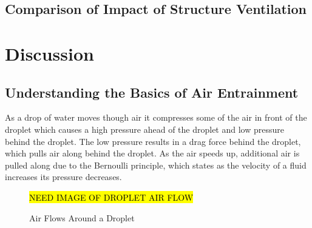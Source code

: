 \documentclass[12pt,oneside]{book}
\begin{document}
\clearpage


\section{Comparison of Impact of Structure Ventilation}









\clearpage

\chapter{Discussion}

\section{Understanding the Basics of Air Entrainment}
As a drop of water moves though air it compresses some of the air in front of the droplet which causes a high pressure ahead of the droplet and low pressure behind the droplet. The low pressure results in a drag force behind the droplet, which pulls air along behind the droplet. As the air speeds up, additional air is pulled along due to the Bernoulli principle, which states as the velocity of a fluid increases its pressure decreases. 

\begin{figure}[!ht]
\hl{NEED IMAGE OF DROPLET AIR FLOW}
\caption{Air Flows Around a Droplet}
\label{fig:droplet_flow}
\end{figure}
\end{document}
